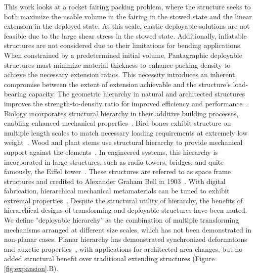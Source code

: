 {This work looks at a rocket fairing packing problem, where the structure seeks to both maximize the usable volume in the fairing in the stowed state and the linear extension in the deployed state}. At this scale, elastic deployable solutions are not feasible due to the large shear stress in the stowed state. Additionally, inflatable structures are not considered due to their limitations for bending applications. When constrained by a predetermined initial volume, Pantagraphic deployable structures must minimize material thickness to enhance packing density to achieve the necessary extension ratios. This necessity introduces an inherent compromise between the extent of extension achievable and the structure's load-bearing capacity. The geometric hierarchy in natural and architected structures improves the strength-to-density ratio for improved efficiency and performance~\cite{lakes_materials_1993,schaedler_architected_2016,bauer_nanolattices_2017, schwaiger_extreme_2019}. Biology incorporates {structural }hierarchy in their additive building processes, enabling enhanced mechanical properties~\cite{fratzl_natures_2007}. Bird bones exhibit structure on multiple length scales to match necessary loading requirements at extremely low weight~\cite{sullivan_extreme_2017}. Wood and plant stems use {structural} hierarchy to provide mechanical support against the elements~\cite{lakes_materials_1993,chen_bio-mimetic_2013}. In engineered systems, {this} hierarchy is incorporated in large structures, such as radio towers, bridges, and quite famously, the Eiffel tower~\cite{lakes_materials_1993}. {These structures are referred to as space frame structures and credited to Alexander Graham Bell in 1903~\cite{chilton_space_1999}.} With digital fabrication, hierarchical mechanical metamaterials can be tuned to exhibit extremal properties~\cite{banerjee_mechanical_2014,bauer_nanolattices_2017}. Despite the structural utility of hierarchy, the benefits of hierarchical designs of transforming and deployable structures have been muted. {We define "deployable hierarchy" as the combination of multiple transforming mechanisms arranged at different size scales, which has not been demonstrated in non-planar cases. }Planar hierarchy has demonstrated synchronized deformations and auxetic properties~\cite{xu_design_2017,gatt_hierarchical_2015}, with applications for architected area changes, but no added structural benefit over traditional extending structures (Figure \ref{fig:expansion}.B). 

